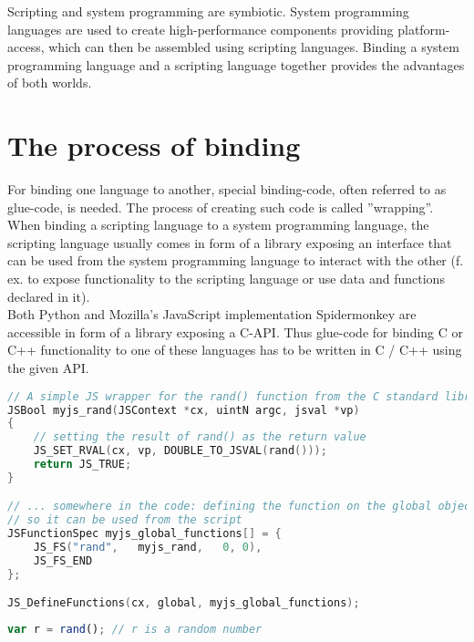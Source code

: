 Scripting and system programming are symbiotic. System programming languages are used to create high-performance components providing platform-access, which can then be assembled using scripting languages. Binding a system programming language and a scripting language together provides the advantages of both worlds.


\section{The process of binding}

For binding one language to another, special binding-code, often referred to as glue-code, is needed. The process of creating such code is called ''wrapping''. When binding a scripting language to a system programming language, the scripting language usually comes in form of a library exposing an interface that can be used from the system programming language to interact with the other (f. ex. to expose functionality to the scripting language or use data and functions declared in it).\\
Both Python and Mozilla's JavaScript implementation Spidermonkey are accessible in form of a library exposing a C-API. Thus glue-code for binding C or C++ functionality to one of these languages has to be written in C / C++ using the given API.

\begin{lstlisting}[language=C++, caption=Exposing a C function to Spidermonkey (taken from MDN)]
// A simple JS wrapper for the rand() function from the C standard library
JSBool myjs_rand(JSContext *cx, uintN argc, jsval *vp)
{
    // setting the result of rand() as the return value
    JS_SET_RVAL(cx, vp, DOUBLE_TO_JSVAL(rand()));
    return JS_TRUE;
}

// ... somewhere in the code: defining the function on the global object
// so it can be used from the script
JSFunctionSpec myjs_global_functions[] = {
    JS_FS("rand",   myjs_rand,   0, 0),
    JS_FS_END
};

JS_DefineFunctions(cx, global, myjs_global_functions);
\end{lstlisting}

\begin{lstlisting}[language=JavaScript, caption=Using a C function from SpiderMonkey]
var r = rand();	// r is a random number
\end{lstlisting}

